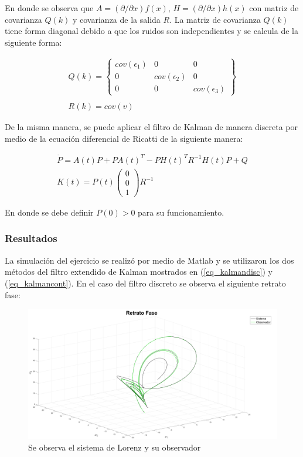En donde se observa que $A = (\partial/\partial x)f(x)$, $H = (\partial/\partial x)h(x)$ con matriz de covarianza $Q(k)$ y covarianza de la salida $R$. La matriz de covarianza $Q(k)$ tiene forma diagonal debido a que los ruidos son independientes y se calcula de la siguiente forma:

\begin{equation}
	\begin{array}{l}
		Q(k) = \begin{Bmatrix}
		cov(\epsilon_1) & 0 & 0\\
		0 & cov(\epsilon_2) & 0\\
		0 & 0 & cov(\epsilon_3)
		\end{Bmatrix}\\
		\\
		R(k) = cov(v)
	\end{array}
\end{equation}

De la misma manera, se puede aplicar el filtro de Kalman de manera discreta por medio de la ecuación diferencial de Ricatti de la siguiente manera:

\begin{equation}\label{eq_kalmancont}
	\begin{array}{l}
	\dot{P} = A(t)P + PA(t)^T - PH(t)^TR^{-1}H(t)P + Q\\
	K(t) = P(t)\begin{pmatrix}
	0 \\ 0 \\ 1
	\end{pmatrix}R^{-1}
	\end{array}
\end{equation}

En donde se debe definir $P(0) > 0$ para su funcionamiento.

\subsubsection*{Resultados}

La simulación del ejercicio se realizó por medio de Matlab y se utilizaron los dos métodos del filtro extendido de Kalman mostrados en (\ref{eq_kalmandisc}) y (\ref{eq_kalmancont}). En el caso del filtro discreto se observa el siguiente retrato fase:

\begin{figure}[H]
	\centering
	\includegraphics[width=150mm]{img/E1_RetratoFase_Disc.png}
	\caption{Se observa el sistema de Lorenz y su observador}
	\label{img:lorenzD1}
\end{figure}

